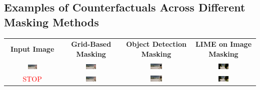 \subsection*{Examples of Counterfactuals Across Different Masking Methods}

\begin{table}[htbp]
\centering
\renewcommand{\arraystretch}{1.2}

\begin{tabular}{c|ccc}
\textbf{Input Image} 
& \textbf{Grid-Based Masking} 
& \textbf{Object Detection Masking} 
& \textbf{LIME on Image Masking} \\
\includegraphics[width=0.18\textwidth]{img/appendix/original_town7_000980.png}
& \includegraphics[width=0.18\textwidth]{img/appendix/grid_masked_town7_000980.png}
& \includegraphics[width=0.18\textwidth]{img/appendix/object_masked_town7_000980.png}
& \includegraphics[width=0.18\textwidth]{img/appendix/LIME_on_Image_maksed_town7_000980.png} \\
\textcolor{red}{STOP}
& \includegraphics[width=0.18\textwidth]{img/appendix/grid_reconstructed_town7_000980.png}
& \includegraphics[width=0.18\textwidth]{img/appendix/object_reconstructed_town7_000980.png}
& \includegraphics[width=0.18\textwidth]{img/appendix/LIME_on_Image_reconstructed_town7_000980.png} \\


\end{tabular}
\end{table}
